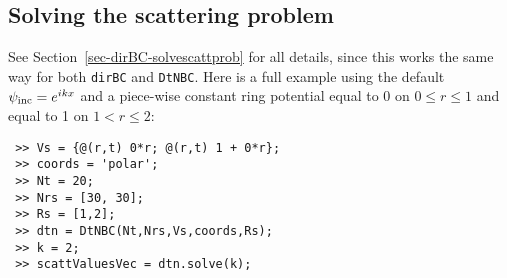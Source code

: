 \subsection{Solving the scattering problem}
\label{sec-DtNBC-solvescattprob}

See Section~\ref{sec-dirBC-solvescattprob} for all details, since 
this works the same way for both {\tt dirBC} and {\tt DtNBC}.
Here is
a full example using the default $\psi_{\text{inc}} = e^{ikx}$ and a piece-wise
constant ring potential equal to 0 on $0 \le r \le 1$ and
equal to 1 on $1 < r \le 2$:
\begin{verbatim}
 >> Vs = {@(r,t) 0*r; @(r,t) 1 + 0*r};
 >> coords = 'polar';
 >> Nt = 20;
 >> Nrs = [30, 30];
 >> Rs = [1,2];
 >> dtn = DtNBC(Nt,Nrs,Vs,coords,Rs);
 >> k = 2;
 >> scattValuesVec = dtn.solve(k);
\end{verbatim}

